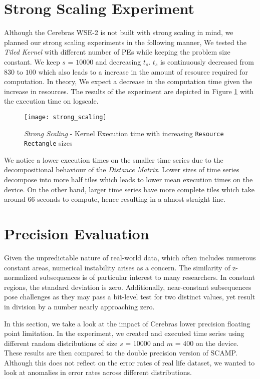 \section{Strong Scaling Experiment} \label{section:strong_scaling}

Although the Cerebras WSE-2 is not built with strong scaling in mind, we planned our strong scaling experiments in the following manner, We tested the \textit{Tiled Kernel} with different number of PEs while keeping the problem size constant. We keep $s$ = $10000$ and decreasing $t_s$. $t_s$ is continuously decreased from $830$ to $100$ which also leads to a increase in the amount of resource required for computation. In theory, We expect a decrease in the computation time given the increase in resources. The results of the experiment are depicted in Figure \ref{fig:strong} with the execution time on logscale.

\begin{figure}[h!]
    \texttt{[image: strong\_scaling]}
    \centering
    \caption{\textit{Strong Scaling} - Kernel Execution time with increasing \texttt{Resource Rectangle} sizes}
    \label{fig:strong}
\end{figure}

We notice a lower execution times on the smaller time series due to the decompositional behaviour of the \textit{Distance Matrix}. Lower sizes of time series decompose into more half tiles which leads to lower mean execution times on the device. On the other hand, larger time series have more complete tiles which take around 66 seconds to compute, hence resulting in a almost straight line.

\section{Precision Evaluation} \label{section:precision_eval}

Given the unpredictable nature of real-world data, which often includes numerous constant areas, numerical instability arises as a concern. The similarity of z-normalized subsequences is of particular interest to many researchers. In constant regions, the standard deviation is zero. Additionally, near-constant subsequences pose challenges as they may pass a bit-level test for two distinct values, yet result in division by a number nearly approaching zero.

In this section, we take a look at the impact of Cerebras lower precision floating point limitation. In the experiment, we created and executed time series using different random distributions of size $s$ = 10000 and $m$ = 400 on the device. These results are then compared to the double precision version of SCAMP. Although this does not reflect on the error rates of real life dataset, we wanted to look at anomalies in error rates across different distributions. 

